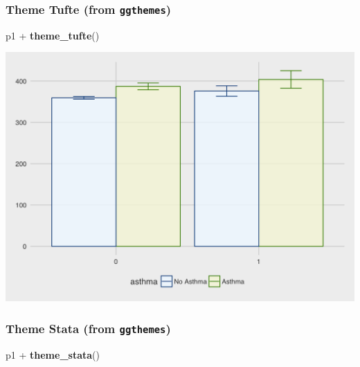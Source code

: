 \documentclass[]{tufte-book}
\newenvironment{Shaded}{}{}
\newcommand{\KeywordTok}[1]{\textcolor[rgb]{0.00,0.44,0.13}{\textbf{#1}}}
\newcommand{\StringTok}[1]{\textcolor[rgb]{0.25,0.44,0.63}{#1}}
\newcommand{\OperatorTok}[1]{\textcolor[rgb]{0.40,0.40,0.40}{#1}}
\newcommand{\NormalTok}[1]{#1}
\theoremstyle{definition}
\theoremstyle{definition}
\theoremstyle{remark}
\begin{document}
\subsubsection*{\texorpdfstring{Theme Tufte (from
\texttt{ggthemes})}{Theme Tufte (from ggthemes)}}\label{theme-tufte-from-ggthemes}

\begin{Shaded}
\begin{Highlighting}[]
\NormalTok{p1 }\OperatorTok{+}\StringTok{ }\KeywordTok{theme_tufte}\NormalTok{()}
\end{Highlighting}
\end{Shaded}

\includegraphics{_main_files/figure-latex/unnamed-chunk-151-1}

\subsubsection*{\texorpdfstring{Theme Stata (from
\texttt{ggthemes})}{Theme Stata (from ggthemes)}}\label{theme-stata-from-ggthemes}

\begin{Shaded}
\begin{Highlighting}[]
\NormalTok{p1 }\OperatorTok{+}\StringTok{ }\KeywordTok{theme_stata}\NormalTok{()}
\end{Highlighting}
\end{Shaded}
\end{document}
